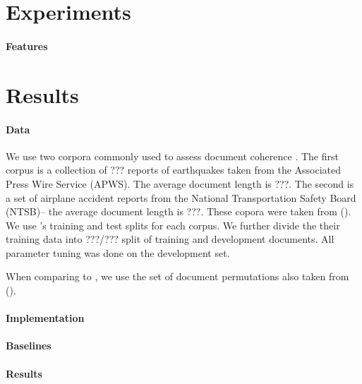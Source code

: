 \section{Experiments}

\paragraph{Features}



\section{Results}

\paragraph{Data}

We use two corpora commonly used to assess document coherence .
The first corpus is a collection of ??? reports of earthquakes taken from the Associated Press Wire Service (APWS). The average document length is ???.  
The second is a set of airplane accident reports from the National Transportation Safety Board (NTSB)-- the average document length is ???.
These copora were taken from (). We use \cite{bandl}'s training and test splits for each corpus. We further divide the their training data into ???/??? split of training and development documents. All parameter tuning was done on the development set.

When comparing to \cite{bandl,louisandnenkova}, we use the set of document permutations also taken from ().

\paragraph{Implementation}


\paragraph{Baselines}


\paragraph{Results}


